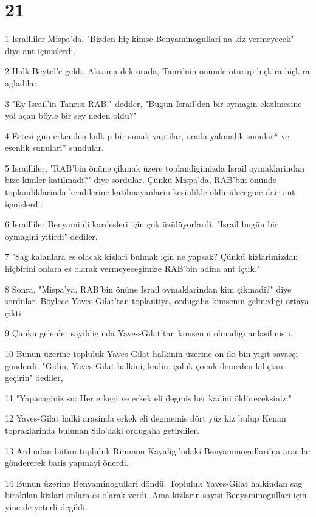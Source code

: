 \chapter{21}

\par 1 Israilliler Mispa'da, "Bizden hiç kimse Benyaminogullari'na kiz vermeyecek" diye ant içmislerdi.
\par 2 Halk Beytel'e geldi. Aksama dek orada, Tanri'nin önünde oturup hiçkira hiçkira agladilar.
\par 3 "Ey Israil'in Tanrisi RAB!" dediler, "Bugün Israil'den bir oymagin eksilmesine yol açan böyle bir sey neden oldu?"
\par 4 Ertesi gün erkenden kalkip bir sunak yaptilar, orada yakmalik sunular* ve esenlik sunulari* sundular.
\par 5 Israilliler, "RAB'bin önüne çikmak üzere toplandigimizda Israil oymaklarindan bize kimler katilmadi?" diye sordular. Çünkü Mispa'da, RAB'bin önünde toplandiklarinda kendilerine katilmayanlarin kesinlikle öldürülecegine dair ant içmislerdi.
\par 6 Israilliler Benyaminli kardesleri için çok üzülüyorlardi. "Israil bugün bir oymagini yitirdi" dediler,
\par 7 "Sag kalanlara es olacak kizlari bulmak için ne yapsak? Çünkü kizlarimizdan hiçbirini onlara es olarak vermeyecegimize RAB'bin adina ant içtik."
\par 8 Sonra, "Mispa'ya, RAB'bin önüne Israil oymaklarindan kim çikmadi?" diye sordular. Böylece Yaves-Gilat'tan toplantiya, ordugaha kimsenin gelmedigi ortaya çikti.
\par 9 Çünkü gelenler sayildiginda Yaves-Gilat'tan kimsenin olmadigi anlasilmisti.
\par 10 Bunun üzerine topluluk Yaves-Gilat halkinin üzerine on iki bin yigit savasçi gönderdi. "Gidin, Yaves-Gilat halkini, kadin, çoluk çocuk demeden kiliçtan geçirin" dediler,
\par 11 "Yapacaginiz su: Her erkegi ve erkek eli degmis her kadini öldüreceksiniz."
\par 12 Yaves-Gilat halki arasinda erkek eli degmemis dört yüz kiz bulup Kenan topraklarinda bulunan Silo'daki ordugaha getirdiler.
\par 13 Ardindan bütün topluluk Rimmon Kayaligi'ndaki Benyaminogullari'na aracilar göndererek baris yapmayi önerdi.
\par 14 Bunun üzerine Benyaminogullari döndü. Topluluk Yaves-Gilat halkindan sag birakilan kizlari onlara es olarak verdi. Ama kizlarin sayisi Benyaminogullari için yine de yeterli degildi.
